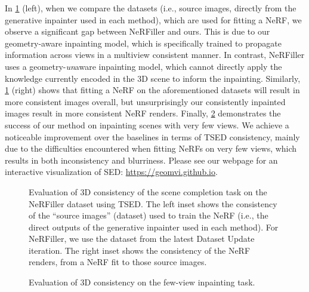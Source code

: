 In \cref{fig:tsed-nerfiller} (left), when we compare the datasets (i.e., source images, directly from the generative inpainter used in each method), which are used for fitting a NeRF, we observe a significant gap between NeRFiller and ours. 
This is due to our geometry-aware inpainting model,  
which is specifically trained to propagate information across views in a multiview consistent manner.
In contrast, NeRFiller uses a geometry-\textit{un}aware inpainting model, which cannot directly apply the knowledge currently encoded in the 3D scene to inform the inpainting.
Similarly, \cref{fig:tsed-nerfiller} (right) shows that fitting a NeRF on the aforementioned datasets will result in more consistent images overall, but unsurprisingly our consistently inpainted images result in more consistent NeRF renders. Finally, \cref{fig:tsed-few-view} demonstrates the success of our method on inpainting scenes with very few views. We achieve a noticeable improvement over the baselines in terms of TSED consistency, mainly due to the difficulties encountered when fitting NeRFs on very few views, which results in both inconsistency and blurriness.
Please see our webpage for an interactive visualization of SED: \href{https://geomvi.github.io}{https://geomvi.github.io}.

\begin{figure}[t]
    \centering
    \begin{subfigure}{0.34\linewidth}
        
    \end{subfigure}
    \begin{subfigure}{0.60\linewidth}
        
    \end{subfigure}
    \vspace{-0.25in}
    \caption{
    Evaluation of 3D consistency of the scene completion task on the NeRFiller dataset using TSED. 
    The left inset shows the consistency of the ``source images'' (dataset) used to train the NeRF (i.e., the direct outputs of the generative inpainter used in each method). For NeRFiller, we use the dataset from the latest Dataset Update iteration.
    The right inset shows the consistency of the NeRF renders, from a NeRF fit to those source images.
    }
    \label{fig:tsed-nerfiller}
\end{figure}

\begin{figure}[t]
    \centering
    \begin{subfigure}{\linewidth}
        
    \end{subfigure}
    \vspace{-0.4in}
    \caption{
    Evaluation of 3D consistency on the few-view inpainting task.
    }
    \label{fig:tsed-few-view}
\end{figure}


